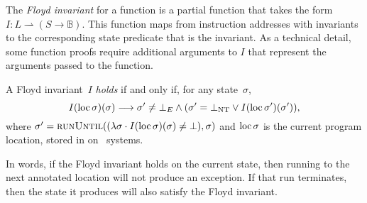 The \emph{Floyd invariant}%
for a function is a partial function that takes the form
$I:L\rightharpoonup(S\rightarrow\mathbb{B})$.%
%
This function maps from instruction addresses with invariants
to the corresponding state predicate that is the invariant.
As a technical detail, some function proofs require additional arguments to $I$
that represent the arguments passed to the function.
\begin{definition}\label{def:floyd_inv}
  A Floyd invariant~$I$ \emph{holds} if and only if, for any state~$\sigma$,
  \begin{equation}
    I(\operatorname{loc}\sigma)(\sigma)\longrightarrow
    \sigma'\neq\bot_E\wedge(\sigma'=\bot_\mathrm{NT}\vee I(\operatorname{loc}\sigma')(\sigma')),
  \end{equation}
  where
  $\sigma'=\operatorname{\textsc{runUntil}}((\lambda\sigma\cdot I(\operatorname{loc}\sigma)(\sigma)\neq\bot),\sigma)$%
  and $\operatorname{loc}\sigma$ is the current program location,
  stored in  on \arch\ systems.
\end{definition}
In words, if the Floyd invariant holds on the current state,
then running to the next annotated location will not produce an exception.
If that run terminates, then the state it produces
will also satisfy the Floyd invariant.

